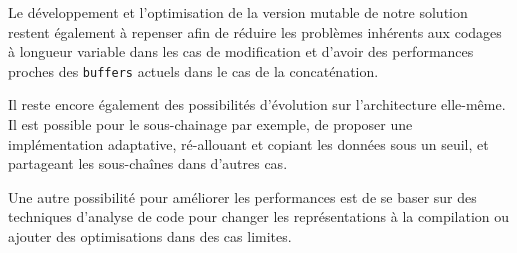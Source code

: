 \begin{conclusion}
Le développement et l'optimisation de la version mutable de notre solution restent également à repenser
afin de réduire les problèmes inhérents aux codages à longueur variable dans les cas de modification et d'avoir
des performances proches des \texttt{buffers} actuels dans le cas de la concaténation.

Il reste encore également des possibilités d'évolution sur l'architecture elle-même.
Il est possible pour le sous-chainage par exemple, de proposer une implémentation adaptative, ré-allouant
et copiant les données sous un seuil, et partageant les sous-chaînes dans d'autres cas.

Une autre possibilité pour améliorer les performances est de se baser sur des techniques d'analyse de code
pour changer les représentations à la compilation ou ajouter des optimisations dans des cas limites.
\end{conclusion}
